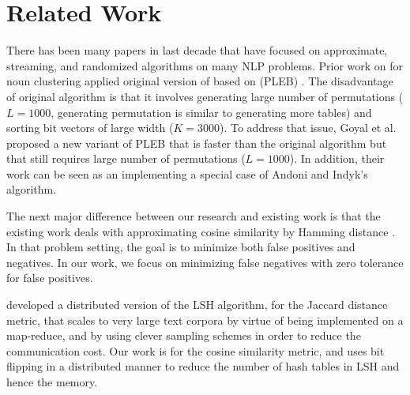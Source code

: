 
\section{Related Work}

There has been many papers in last decade that have focused on 
approximate, streaming, and randomized algorithms on many NLP problems. 
Prior work on \lsh for noun clustering \cite{ravichandran05} applied 
original version of \lsh based on \plebf (PLEB) \cite{Indyk98STOC,Charikar02STOC}. 
The disadvantage of original \lsh algorithm is that it involves generating large number of permutations ($L=1000$, 
generating permutation is similar to generating more tables)
and sorting bit vectors of large width ($K=3000$). 
To address that issue, Goyal et al. \cite{goyal12Flag} proposed a new variant of PLEB that
is faster than the original \lsh algorithm but that still requires large number of permutations 
($L=1000$). In addition, their work can be seen as an implementing a special case of Andoni and Indyk's \lsh algorithm.  

The next major difference between our research and existing work is that the 
existing work deals with approximating cosine similarity by Hamming distance  
\cite{ravichandran05,vandurme-lall:2010:Short,vandurme-lall:2011:Short,goyal12Flag}. 
In that problem setting, the goal is to minimize both false positives and negatives. 
In our work, we focus on minimizing false negatives with zero tolerance for false positives.

\cite{zadeh2013dimension} developed a distributed version of the LSH algorithm, for 
the Jaccard distance metric, that scales to very large text corpora by virtue of being implemented on a map-reduce, 
and by using clever sampling schemes in order to reduce the communication cost. Our work is for the cosine similarity metric, 
and uses bit flipping in a distributed manner to reduce the number of hash tables in LSH and hence the memory. 
